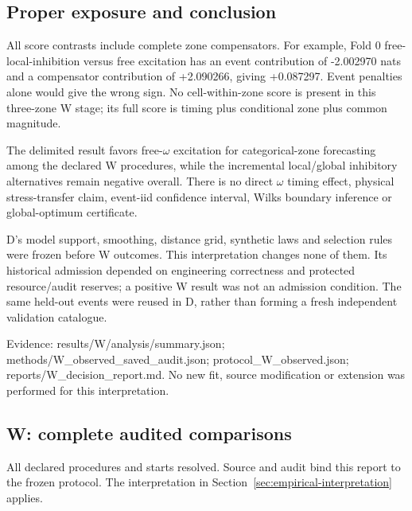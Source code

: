 \subsection{Proper exposure and conclusion}

All score contrasts include complete zone compensators. For example, Fold 0 free-local-inhibition versus free excitation has an event contribution of -2.002970 nats and a compensator contribution of +2.090266, giving +0.087297. Event penalties alone would give the wrong sign. No cell-within-zone score is present in this three-zone W stage; its full score is timing plus conditional zone plus common magnitude.

The delimited result favors free-$\omega$ excitation for categorical-zone forecasting among the declared W procedures, while the incremental local/global inhibitory alternatives remain negative overall. There is no direct $\omega$ timing effect, physical stress-transfer claim, event-iid confidence interval, Wilks boundary inference or global-optimum certificate.

D's model support, smoothing, distance grid, synthetic laws and selection rules were frozen before W outcomes. This interpretation changes none of them. Its historical admission depended on engineering correctness and protected resource/audit reserves; a positive W result was not an admission condition. The same held-out events were reused in D, rather than forming a fresh independent validation catalogue.

Evidence: results/\allowbreak{}\allowbreak{}W/analysis/\allowbreak{}\allowbreak{}summary.json; methods/\allowbreak{}\allowbreak{}W\_\allowbreak{}observed\_\allowbreak{}saved\_\allowbreak{}audit.json; protocol\_\allowbreak{}W\_\allowbreak{}observed.json; reports/\allowbreak{}\allowbreak{}W\_\allowbreak{}decision\_\allowbreak{}report.md. No new fit, source modification or extension was performed for this interpretation.

\subsection{W: complete audited comparisons}

All declared procedures and starts resolved. Source and audit bind this report to the frozen protocol. The interpretation in Section~\ref{sec:empirical-interpretation} applies.

